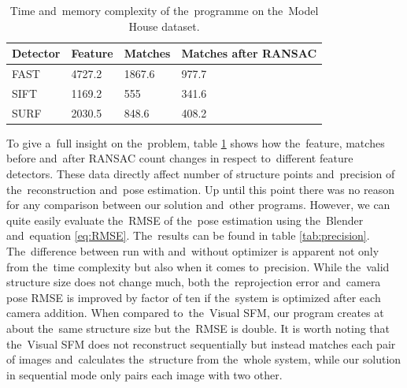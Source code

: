 \begin{table}[!htbp]
	\begin{center}
		\begin{tabular}{| l | l | l | l |}
			\hline
			\textbf{Detector} & \textbf{Feature} &  \textbf{Matches}  & \textbf{Matches after RANSAC}  \\ \hline 
			FAST & 4727.2 & 1867.6 & 977.7 \\ \hline 
			SIFT & 1169.2 & 555 & 341.6 \\ \hline 
			SURF & 2030.5 & 848.6 & 408.2 \\ \hline 
		\end{tabular}
		\caption{Time and~memory complexity of the~programme on the~Model House dataset.}
		\label{tab:keypoints_matches}
	\end{center}
\end{table}

To give a~full insight on the~problem, table \ref{tab:keypoints_matches} shows how the~feature, matches before and~after RANSAC count changes in respect to~different feature detectors. These data directly affect number of structure points and~precision of the~reconstruction and~pose estimation. Up until this point there was no reason for any comparison between our solution and~other programs. However, we can quite easily evaluate the~RMSE of the~pose estimation using the~Blender and~equation \ref{eq:RMSE}.  The~results can be found in table \ref{tab:precision}. The~difference between run with and~without optimizer is apparent not only from the~time complexity but also when it comes to~precision. While the~valid structure size does not change much, both the~reprojection error and~camera pose RMSE is improved by factor of ten if the~system is optimized after each camera addition. When compared to~the~Visual SFM, our program creates at about the~same structure size but the~RMSE is double. It is worth noting that the~Visual SFM does not reconstruct sequentially but instead matches each pair of images and~calculates the~structure from the~whole system, while our solution in sequential mode only pairs each image with two other.

